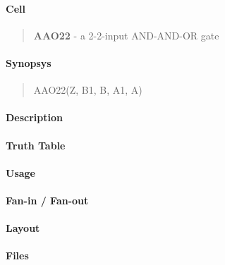 \label{AAO22}
\paragraph{Cell}
\begin{quote}
    \textbf{AAO22} - a 2-2-input AND-AND-OR gate
\end{quote}

\paragraph{Synopsys}
\begin{quote}
    AAO22(Z, B1, B, A1, A)
\end{quote}

\paragraph{Description}

%

\paragraph{Truth Table}
%

\paragraph{Usage}

\paragraph{Fan-in / Fan-out}

\paragraph{Layout}

\paragraph{Files}

\clearpage
